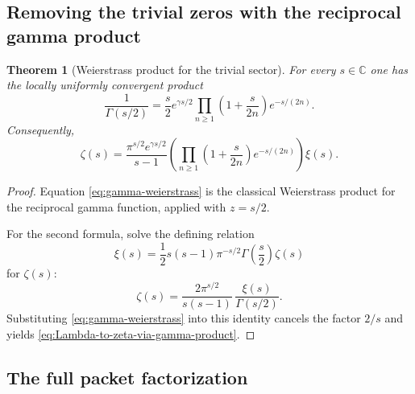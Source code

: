 \documentclass[11pt,a4paper]{article}
\numberwithin{equation}{section}
\newtheorem{theorem}{Theorem}[section]
\theoremstyle{definition}
\theoremstyle{remark}
\newcommand{\CC}{\mathbb C}
\begin{document}
\subsection{Removing the trivial zeros with the reciprocal gamma product}

\begin{theorem}[Weierstrass product for the trivial sector]\label{thm:gamma-product}
For every $s\in\CC$ one has the locally uniformly convergent product
\begin{equation}\label{eq:gamma-weierstrass}
\frac{1}{\Gamma(s/2)}=\frac{s}{2}e^{\gamma s/2}\prod_{n\ge 1}\left(1+\frac{s}{2n}\right)e^{-s/(2n)}.
\end{equation}
Consequently,
\begin{equation}\label{eq:Lambda-to-zeta-via-gamma-product}
\zeta(s)=\frac{\pi^{s/2}e^{\gamma s/2}}{s-1}\left(\prod_{n\ge 1}\left(1+\frac{s}{2n}\right)e^{-s/(2n)}\right)\xi(s).
\end{equation}
\end{theorem}

\begin{proof}
Equation \eqref{eq:gamma-weierstrass} is the classical Weierstrass product for the reciprocal gamma function, applied with $z=s/2$.

For the second formula, solve the defining relation
\[
\xi(s)=\frac12 s(s-1)\pi^{-s/2}\Gamma\!\left(\frac{s}{2}\right)\zeta(s)
\]
for $\zeta(s)$:
\[
\zeta(s)=\frac{2\pi^{s/2}}{s(s-1)}\,\frac{\xi(s)}{\Gamma(s/2)}.
\]
Substituting \eqref{eq:gamma-weierstrass} into this identity cancels the factor $2/s$ and yields \eqref{eq:Lambda-to-zeta-via-gamma-product}.
\end{proof}

\subsection{The full packet factorization}
\end{document}
